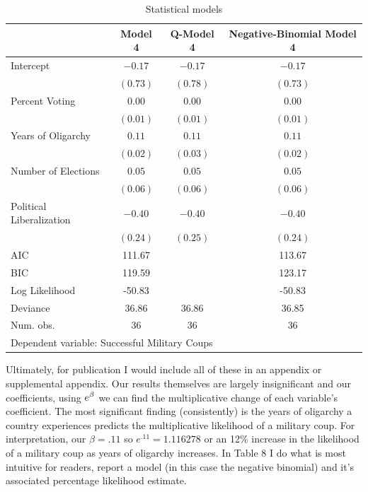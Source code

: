 \documentclass[12pt]{article}\usepackage[]{graphicx}\usepackage[]{color}
\begin{document}
\begin{flushleft}
\begin{table}[h!]
\caption{Statistical models}
\begin{center}
\begin{tabular}{l c c c }
\hline
 & Model 4 & Q-Model 4 & Negative-Binomial Model 4 \\
\hline
Intercept                & $-0.17$  & $-0.17$  & $-0.17$  \\
                         & $(0.73)$ & $(0.78)$ & $(0.73)$ \\
Percent Voting           & $0.00$   & $0.00$   & $0.00$   \\
                         & $(0.01)$ & $(0.01)$ & $(0.01)$ \\
Years of Oligarchy       & $0.11$   & $0.11$   & $0.11$   \\
                         & $(0.02)$ & $(0.03)$ & $(0.02)$ \\
Number of Elections      & $0.05$   & $0.05$   & $0.05$   \\
                         & $(0.06)$ & $(0.06)$ & $(0.06)$ \\
Political Liberalization & $-0.40$  & $-0.40$  & $-0.40$  \\
                         & $(0.24)$ & $(0.25)$ & $(0.24)$ \\
\hline
AIC                      & 111.67   &          & 113.67   \\
BIC                      & 119.59   &          & 123.17   \\
Log Likelihood           & -50.83   &          & -50.83   \\
Deviance                 & 36.86    & 36.86    & 36.85    \\
Num. obs.                & 36       & 36       & 36       \\
\hline
\multicolumn{4}{l}{\scriptsize{Dependent variable: Successful Military Coups}}
\end{tabular}
\end{center}
\end{table}


Ultimately, for publication I would include all of these in an appendix or supplemental appendix. Our results themselves are largely insignificant and our coefficients, using $\mathlarger{ e^{\beta} }$ we can find the multiplicative change of each variable's coefficient. The most significant finding (consistently) is the years of oligarchy a country experiences predicts the multiplicative likelihood of a military coup. For interpretation, our $\beta = .11$ so $e^{.11} = 1.116278$ or an 12\% increase in the likelihood of a military coup as years of oligarchy increases. In Table 8 I do what is most intuitive for readers, report a model (in this case the negative binomial) and it's associated percentage likelihood estimate.
\clearpage



\end{flushleft}
\end{document}
